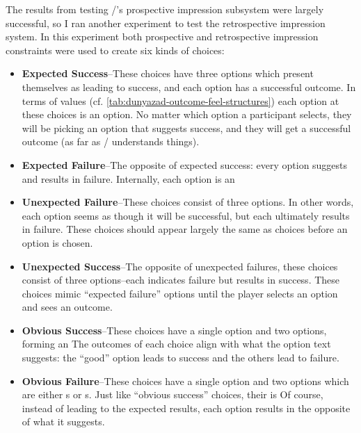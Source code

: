 \label{sec:exp-retrospective}

The results from testing \dunyazad/'s prospective impression subsystem were largely successful, so I ran another experiment to test the retrospective impression system.
%
In this experiment both prospective and retrospective impression constraints were used to create six kinds of choices:

\begin{itemize}
  \item \textbf{Expected Success}--These choices have three options which present themselves as leading to success, and each option has a successful outcome. In terms of  values (cf. \cref{tab:dunyazad-outcome-feel-structures}) each option at these choices is an \exps option. No matter which option a participant selects, they will be picking an option that suggests success, and they will get a successful outcome (as far as \dunyazad/ understands things).
  \item \textbf{Expected Failure}--The opposite of expected success: every option suggests and results in failure. Internally, each option is an 
  \item \textbf{Unexpected Failure}--These choices consist of three  options. In other words, each option seems as though it will be successful, but each ultimately results in failure. These choices should appear largely the same as \exps{} choices before an option is chosen.
  \item \textbf{Unexpected Success}--The opposite of unexpected failures, these choices consist of three  options--each indicates failure but results in success. These choices mimic ``expected failure'' options until the player selects an option and sees an outcome.
  \item \textbf{Obvious Success}--These choices have a single \exps{} option and two \expf{} options, forming an \obv{}  The outcomes of each choice align with what the option text suggests: the ``good'' option leads to success and the others lead to failure.
  \item \textbf{Obvious Failure}--These choices have a single  option and two options which are either s or s. Just like ``obvious success'' choices, their  is  Of course, instead of leading to the expected results, each option results in the opposite of what it suggests.
\end{itemize}

